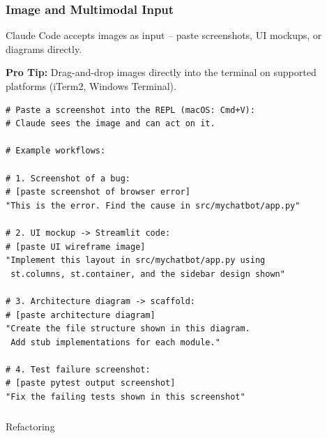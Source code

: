 \begin{frame}[fragile]\frametitle{Image and Multimodal Input}
Claude Code accepts images as input -- paste screenshots, UI mockups, or diagrams directly.

\textbf{Pro Tip:} Drag-and-drop images directly into the terminal on supported platforms (iTerm2, Windows Terminal).


\begin{lstlisting}
# Paste a screenshot into the REPL (macOS: Cmd+V):
# Claude sees the image and can act on it.

# Example workflows:

# 1. Screenshot of a bug:
# [paste screenshot of browser error]
"This is the error. Find the cause in src/mychatbot/app.py"

# 2. UI mockup -> Streamlit code:
# [paste UI wireframe image]
"Implement this layout in src/mychatbot/app.py using
 st.columns, st.container, and the sidebar design shown"

# 3. Architecture diagram -> scaffold:
# [paste architecture diagram]
"Create the file structure shown in this diagram.
 Add stub implementations for each module."

# 4. Test failure screenshot:
# [paste pytest output screenshot]
"Fix the failing tests shown in this screenshot"
\end{lstlisting}

\end{frame}


\begin{frame}[fragile]\frametitle{}
\begin{center}
{\Large Refactoring}

\end{center}
\end{frame}


